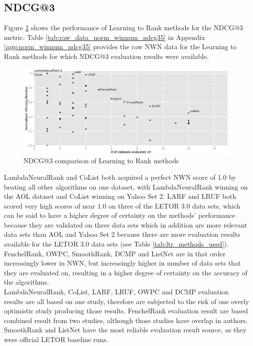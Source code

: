 \subsection{NDCG@3}
Figure \ref{fig:normalised_winning_number_NDCG3} shows the performance of Learning to Rank methods for the \ac{NDCG}@3 metric. Table \ref{tab:raw_data_norm_winnum_ndcg35} in Appendix \ref{app:norm_winnum_ndcg35} provides the raw \ac{NWN} data for the Learning to Rank methods for which \ac{NDCG}@3 evaluation results were available.\\

\begin{figure}[!h]
\includegraphics[scale=0.285]{gfx/ndcg3_winnum}
\caption{\acs{NDCG}@3 comparison of Learning to Rank methods}
\label{fig:normalised_winning_number_NDCG3}
\end{figure}

LambdaNeuralRank and CoList both acquired a perfect \ac{NWN} score of 1.0 by beating all other algorithms on one dataset, with LambdaNeuralRank winning on the AOL dataset and CoList winning on Yahoo Set 2. LARF and LRUF both scored very high scores of near 1.0 on three of the LETOR 3.0 data sets, which can be said to have a higher degree of certainty on the methods' performance because they are validated on three data sets which in addition are more relevant data sets than AOL and Yahoo Set 2 because there are more evaluation results available for the LETOR 3.0 data sets (see Table \ref{tab:ltr_methods_used}). FenchelRank, OWPC, SmoothRank, DCMP and ListNet are in that order increasingly lower in \ac{NWN}, but increasingly higher in number of data sets that they are evaluated on, resulting in a higher degree of certainty on the accuracy of the algorithms.\\

LambdaNeuralRank, CoList, LARF, LRUF, OWPC and DCMP evaluation results are all based on one study, therefore are subjected to the risk of one overly optimistic study producing those results. FenchelRank evaluation result are based combined result from two studies, although those studies have overlap in authors. SmoothRank and ListNet have the most reliable evaluation result source, as they were official LETOR baseline runs.  

